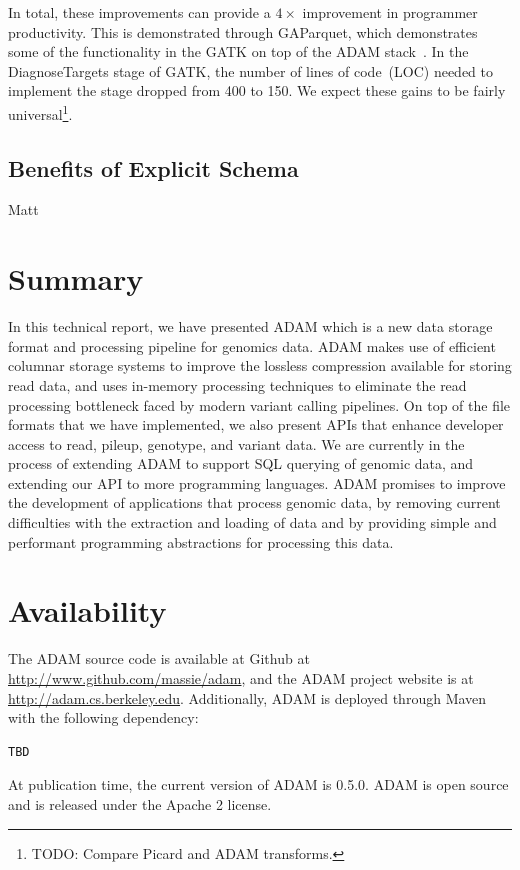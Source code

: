 \documentclass[10pt,twocolumn]{article}
\begin{document}
In total, these improvements can provide a $4\times$ improvement in programmer productivity. This is demonstrated through
GAParquet, which demonstrates some of the functionality in the GATK on top of the ADAM stack~\cite{gaparquet}. In the
DiagnoseTargets stage of GATK, the number of lines of code~(LOC) needed to implement the stage dropped from 400 to
150. We expect these gains to be fairly universal\footnote{TODO: Compare Picard and ADAM transforms.}.

\subsection{Benefits of Explicit Schema}
\label{sec:benefits-of-explicit-schema}

Matt

\section{Summary}
\label{sec:summary}

In this technical report, we have presented ADAM which is a new data storage format and processing pipeline for
genomics data. ADAM makes use of efficient columnar storage systems to improve the lossless compression available
for storing read data, and uses in-memory processing techniques to eliminate the read processing bottleneck faced
by modern variant calling pipelines. On top of the file formats that we have implemented, we also present APIs that enhance
developer access to read, pileup, genotype, and variant data. We are currently in the process of extending ADAM to
support SQL querying of genomic data, and extending our API to more programming languages. ADAM promises
to improve the development of applications that process genomic data, by removing current difficulties with the extraction
and loading of data and by providing simple and performant programming abstractions for processing this data.

\section{Availability}
\label{sec:availability}

The ADAM source code is available at Github at \url{http://www.github.com/massie/adam}, and the ADAM project website
is at \url{http://adam.cs.berkeley.edu}. Additionally, ADAM is deployed through Maven with the following dependency:

\begin{verbatim}
TBD
\end{verbatim}

At publication time, the current version of ADAM is 0.5.0. ADAM is open source and is released under the Apache 2
license.





\clearpage
\end{document}
